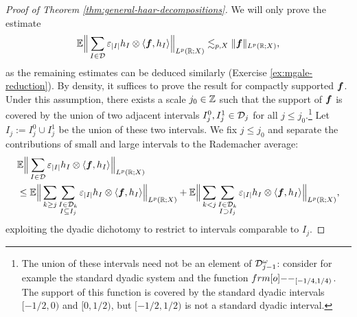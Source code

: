 \begin{proof}[Proof of Theorem \ref{thm:general-haar-decompositions}]
  We will only prove the estimate
  \begin{equation*}
    \mathbb{E} \Big\| \sum_{I \in \mathcal{D}} \varepsilon_{|I|} h_{I} \otimes \langle \bm{f}, h_{I} \rangle \Big\|_{L^p(\mathbb{R};X)} \lesssim_{p,X}     \|\bm{f}\|_{L^p(\mathbb{R};X)},
  \end{equation*}
  as the remaining estimates can be deduced similarly (Exercise \ref{ex:mgale-reduction}).
  By density, it suffices to prove the result for compactly supported $\bm{f}$.
  Under this assumption, there exists a scale $j_{0} \in \mathbb{Z}$ such that the support of $\bm{f}$ is covered by the union of two adjacent intervals $I_{j}^{0}, I_{j}^{1} \in \mathcal{D}_{j}$ for all $j \leq j_{0}$.\footnote{The union of these intervals need not be an element of $\mathcal{D}^{\omega}_{j-1}$: consider for example the standard dyadic system and the function $\1_{[-1/4,1/4)}$.
    The support of this function is covered by the standard dyadic intervals $[-1/2,0)$ and $[0,1/2)$, but $[-1/2,1/2)$ is not a standard dyadic interval.}
  Let $I_{j} := I_{j}^{0} \cup I_{j}^{1}$ be the union of these two intervals.
  We fix $j \leq j_{0}$ and separate the contributions of small and large intervals to the Rademacher average: 
  \begin{equation*}
    \begin{aligned}
      &\mathbb{E} \Big\| \sum_{I \in \mathcal{D}} \varepsilon_{|I|} h_{I} \otimes \langle \bm{f}, h_{I} \rangle \Big\|_{L^p(\mathbb{R};X)} \\
      &\leq \mathbb{E} \Big\| \sum_{k \geq j} \sum_{\substack{I \in \mathcal{D}_{k} \\ I \subseteq I_{j}}} \varepsilon_{|I|} h_{I} \otimes \langle \bm{f}, h_{I} \rangle \Big\|_{L^p(\mathbb{R};X)}
      + \mathbb{E} \Big\| \sum_{k < j} \sum_{\substack{I \in \mathcal{D}_{k} \\ I \supset I_{j}}} \varepsilon_{|I|} h_{I} \otimes \langle \bm{f}, h_{I} \rangle \Big\|_{L^p(\mathbb{R};X)},
    \end{aligned}
  \end{equation*}
  exploiting the dyadic dichotomy to restrict to intervals comparable to $I_{j}$.
  

\end{proof}
